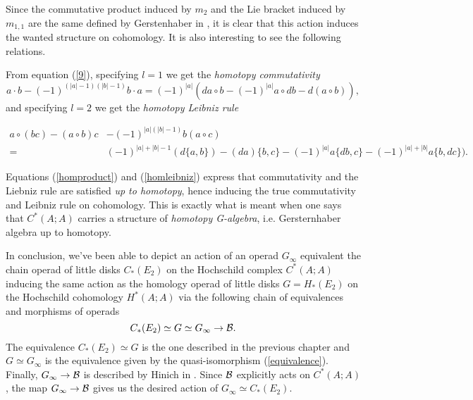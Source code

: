 \documentclass[TFM.tex]{subfiles}
\begin{document}
Since the commutative product induced by $m_2$ and the Lie bracket induced by $m_{1,1}$ are the same defined by Gerstenhaber in \cite{Gerstenhaber}, it is clear that this action induces the wanted structure on cohomology. It is also interesting to see the following relations.

From equation (\ref{9}), specifying $l=1$ we get the \emph{homotopy commutativity}
\begin{equation}\label{homproduct}
a\cdot b-(-1)^{(|a|-1)(|b|-1)}b\cdot a=(-1)^{|a|}(da\circ b-(-1)^{|a|}a\circ db-d(a\circ b)),
\end{equation}
and specifying $l=2$ we get the \emph{homotopy Leibniz rule}

\begin{align}\label{homleibniz}
a\circ (bc)-(a\circ b)c&-(-1)^{|a|(|b|-1)}b(a\circ c)\\
=&(-1)^{|a|+|b|-1}(d\{a,b\})-(da)\{b,c\}-(-1)^{|a|}a\{db,c\}-(-1)^{|a|+|b|}a\{b,dc\})\nonumber.
\end{align}

Equations (\ref{homproduct}) and (\ref{homleibniz}) express that commutativity and the Liebniz rule are satisfied \emph{up to homotopy}, hence inducing the  true commutativity and Leibniz rule on cohomology. This is exactly what is meant when one says that $C^*(A;A)$ carries a structure of \emph{homotopy G-algebra}, i.e. Gersternhaber algebra up to homotopy. 

In conclusion, we've been able to depict an action of an operad $G_\infty$ equivalent the chain operad of little disks $C_*(E_2)$ on the Hochschild complex $C^*(A;A)$ inducing the same action as the homology operad of little disks $G=H_*(E_2)$ on the Hochschild cohomology $H^*(A;A)$ via the following chain of equivalences and morphisms of operads
\[
C_*(E_2)\simeq G \simeq G_\infty \to \mathcal{B}.
\]
The equivalence $C_*(E_2)\simeq G$ is the one described in the previous chapter and $G \simeq G_\infty$ is the equivalence given by the quasi-isomorphism (\ref{equivalence}). Finally, $G_\infty\to\mathcal{B}$ is described by Hinich in \cite{Hinich}. Since $\mathcal{B}$ explicitly acts on $C^*(A;A)$, the map $G_\infty\to\mathcal{B}$ gives us the desired action of $G_\infty\simeq C_*(E_2)$.
\end{document}
